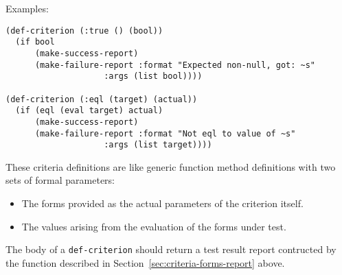 Examples:
\begin{verbatim}
(def-criterion (:true () (bool))
  (if bool
      (make-success-report)
      (make-failure-report :format "Expected non-null, got: ~s"
                    :args (list bool))))

(def-criterion (:eql (target) (actual))
  (if (eql (eval target) actual)
      (make-success-report)
      (make-failure-report :format "Not eql to value of ~s"
                    :args (list target))))
\end{verbatim}
These criteria definitions are like generic function method
definitions with two sets of formal parameters:
\begin{itemize}
\item The forms provided as the actual parameters of the criterion
  itself.
\item The values arising from the evaluation of the forms under test.
\end{itemize}
The body of a \texttt{def-criterion} should return a test result
report contructed by the function described in
Section~\ref{sec:criteria-forms-report} above.
 
% 
% 
% 

